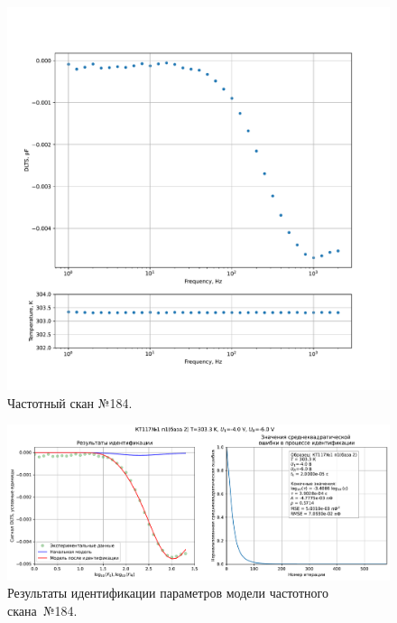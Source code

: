 \begin{figure}[!ht]
    \centering
    \includegraphics[width=1\textwidth]{../plots/КТ117№1_п1(база 2)_2500Гц-1Гц_1пФ_+30С_-4В-6В_100мВ_20мкс_шаг_0,1.pdf}
    \caption{Частотный скан №184.}
    \label{pic:frequency_scan_184}
\end{figure}

\begin{figure}[!ht]
    \centering
    \includegraphics[width=1\textwidth]{../plots/КТ117№1_п1(база 2)_2500Гц-1Гц_1пФ_+30С_-4В-6В_100мВ_20мкс_шаг_0,1_model.pdf}
    \caption{Результаты идентификации параметров модели частотного скана~№184.}
    \label{pic:frequency_scan_model184}
\end{figure}

\pagebreak


